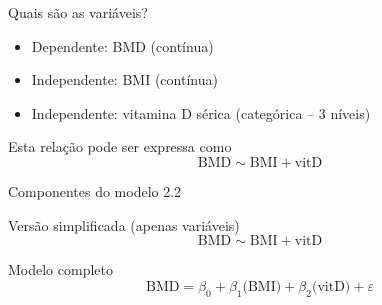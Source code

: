 \documentclass{beamer}
\begin{document}
\begin{frame}{\scriptsize Quais são as variáveis?}
  \begin{itemize}
    \footnotesize
  \item Dependente: BMD (contínua)
  \item Independente: BMI (contínua)
  \item Independente: vitamina D sérica (categórica -- 3 níveis)
  \end{itemize}
  \vfill
  \begin{block}{Esta relação pode ser expressa como}
    \footnotesize
    \begin{displaymath}
      \text{BMD} \sim \text{BMI} + \text{vitD}
    \end{displaymath}
  \end{block}
\end{frame}

\begin{frame}{\scriptsize Componentes do modelo 2.2}
  \begin{block}{\footnotesize Versão simplificada (apenas variáveis)}
    \footnotesize
    \begin{displaymath}
      \text{BMD} \sim \text{BMI} + \text{vitD}
    \end{displaymath}
  \end{block}
  \bigskip
  \bigskip
  \begin{block}{Modelo completo}
    \footnotesize
    \begin{displaymath}
      \text{BMD} =\beta_0 + \beta_1 \text{(BMI)} + \beta_2 \text{(vitD)} +\varepsilon
    \end{displaymath}
  \end{block}
  \vfill
\end{frame}
\end{document}
